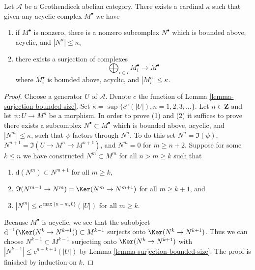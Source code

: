 \begin{lemma}
\label{lemma-acyclic-quotient-complexes-bounded-size}
Let $\mathcal{A}$ be a Grothendieck abelian category. There exists a cardinal
$\kappa$ such that given any acyclic complex $M^\bullet$ we have
\begin{enumerate}
\item if $M^\bullet$ is nonzero, there is a nonzero subcomplex
$N^\bullet$ which is bounded above, acyclic, and $|N^n| \leq \kappa$,
\item there exists a surjection of complexes
$$
\bigoplus\nolimits_{i \in I} M_i^\bullet \longrightarrow M^\bullet
$$
where $M_i^\bullet$ is bounded above, acyclic, and $|M_i^n| \leq \kappa$.
\end{enumerate}
\end{lemma}

\begin{proof}
Choose a generator $U$ of $\mathcal{A}$. Denote $c$ the function of
Lemma \ref{lemma-surjection-bounded-size}.
Set $\kappa = \sup \{c^n(|U|), n = 1, 2, 3, \ldots\}$.
Let $n \in \mathbf{Z}$ and let $\psi : U \to M^n$ be a morphism.
In order to prove (1) and (2) it suffices to prove there exists a subcomplex
$N^\bullet \subset M^\bullet$ which is bounded above, acyclic, and
$|N^m| \leq \kappa$, such that $\psi$ factors through $N^n$.
To do this set $N^n = \Im(\psi)$, $N^{n + 1} = \Im(U \to M^n \to M^{n + 1})$,
and $N^m = 0$ for $m \geq n + 2$.
Suppose for some $k \leq n$ we have constructed $N^m \subset M^m$
for all $n > m \geq k$ such that
\begin{enumerate}
\item $\text{d}(N^m) \subset N^{m + 1}$ for all $m \geq k$,
\item $\Im(N^{m - 1} \to N^m) = \Ker(N^m \to N^{m + 1})$ for
all $m \geq k + 1$, and
\item $|N^m| \leq c^{\max\{n - m, 0\}}(|U|)$ for all $m \geq k$.
\end{enumerate}
Because $M^\bullet$ is acyclic, we see that the subobject
$\text{d}^{-1}(\Ker(N^k \to N^{k + 1})) \subset M^{k - 1}$ surjects onto
$\Ker(N^k \to N^{k + 1})$. Thus we can choose $N^{k - 1} \subset M^{k - 1}$
surjecting onto $\Ker(N^k \to N^{k + 1})$ with
$|N^{k - 1}| \leq c^{n - k + 1}(|U|)$ by
Lemma \ref{lemma-surjection-bounded-size}. The proof is finished by
induction on $k$.
\end{proof}
